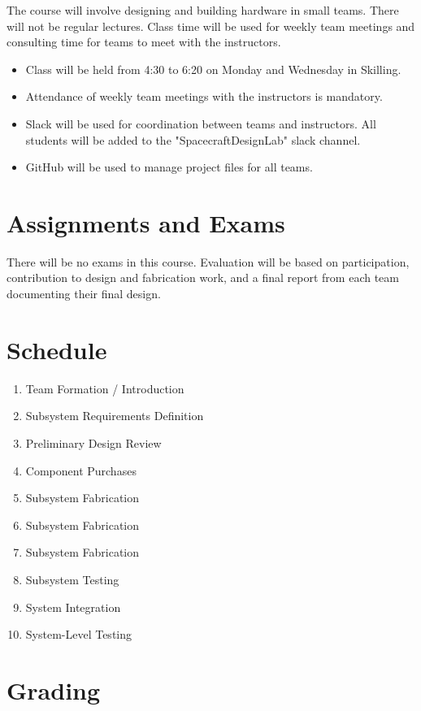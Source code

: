 \documentclass[11pt,letterpaper]{article}
\begin{document}
The course will involve designing and building hardware in small teams. There will not be regular lectures. Class time will be used for weekly team meetings and consulting time for teams to meet with the instructors.

\begin{itemize}
	\item Class will be held from 4:30 to 6:20 on Monday and Wednesday in Skilling.
	\item Attendance of weekly team meetings with the instructors is mandatory.
	\item Slack will be used for coordination between teams and instructors. All students will be added to the "SpacecraftDesignLab" slack channel.
	\item GitHub will be used to manage project files for all teams.
\end{itemize}

\section*{Assignments and Exams}

There will be no exams in this course. Evaluation will be based on participation, contribution to design and fabrication work, and a final report from each team documenting their final design.

\section*{Schedule}

\begin{enumerate}[label=\textbf{Week \arabic*:},leftmargin=3.5\parindent]
	\item Team Formation / Introduction
	\item Subsystem Requirements Definition
	\item Preliminary Design Review
	\item Component Purchases
	\item Subsystem Fabrication
	\item Subsystem Fabrication
	\item Subsystem Fabrication
	\item Subsystem Testing
	\item System Integration
	\item System-Level Testing
\end{enumerate}

\section*{Grading}
\end{document}

